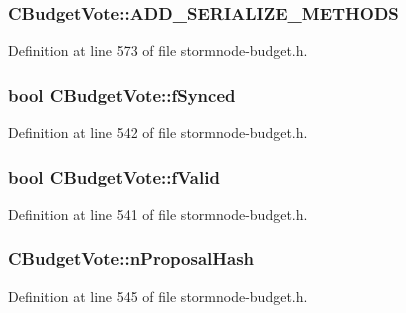 \subsubsection[{A\+D\+D\+\_\+\+S\+E\+R\+I\+A\+L\+I\+Z\+E\+\_\+\+M\+E\+T\+H\+O\+D\+S}]{\setlength{\rightskip}{0pt plus 5cm}C\+Budget\+Vote\+::\+A\+D\+D\+\_\+\+S\+E\+R\+I\+A\+L\+I\+Z\+E\+\_\+\+M\+E\+T\+H\+O\+D\+S}\label{class_c_budget_vote_a9d6b5f88ab856880bd384a7733e3436f}


Definition at line 573 of file stormnode-\/budget.\+h.

\hypertarget{class_c_budget_vote_ada87c71869d08d9869c5739f4a5b626e}{}
\subsubsection[{f\+Synced}]{\setlength{\rightskip}{0pt plus 5cm}bool C\+Budget\+Vote\+::f\+Synced}\label{class_c_budget_vote_ada87c71869d08d9869c5739f4a5b626e}


Definition at line 542 of file stormnode-\/budget.\+h.

\hypertarget{class_c_budget_vote_a069471bf430ecee3065929591dc47aba}{}
\subsubsection[{f\+Valid}]{\setlength{\rightskip}{0pt plus 5cm}bool C\+Budget\+Vote\+::f\+Valid}\label{class_c_budget_vote_a069471bf430ecee3065929591dc47aba}


Definition at line 541 of file stormnode-\/budget.\+h.

\hypertarget{class_c_budget_vote_a185648d07f641e8d663afcbf7a7c1a24}{}
\subsubsection[{n\+Proposal\+Hash}]{ C\+Budget\+Vote\+::n\+Proposal\+Hash}\label{class_c_budget_vote_a185648d07f641e8d663afcbf7a7c1a24}


Definition at line 545 of file stormnode-\/budget.\+h.

\hypertarget{class_c_budget_vote_a7cde3552eacf54d86796d3ff48601125}{}
